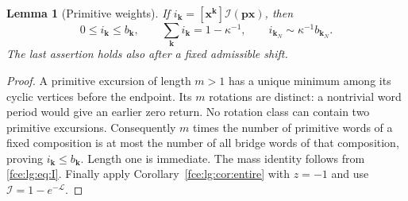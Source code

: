 \documentclass[11pt,a4paper]{article}
\numberwithin{equation}{section}
\newtheorem{lemma}[theorem]{Lemma}
\theoremstyle{definition}\newtheorem{definition}[theorem]{Definition}
\theoremstyle{remark}\newtheorem{remark}[theorem]{Remark}
\newcommand{\Lcal}{\mathcal L}
\begin{document}
\begin{lemma}[Primitive weights]\label{fce:lg:lem:primitive}
If $i_{\boldsymbol k}=[\boldsymbol x^{\boldsymbol k}]\mathcal I(\boldsymbol p\boldsymbol x)$,
then
\[
 0\le i_{\boldsymbol k}\le b_{\boldsymbol k},\qquad
 \sum_{\boldsymbol k} i_{\boldsymbol k}=1-\kappa^{-1},\qquad
 i_{\boldsymbol k_N}\sim \kappa^{-1}b_{\boldsymbol k_N}.
\]
The last assertion holds also after a fixed admissible shift.
\end{lemma}
\begin{proof}
A primitive excursion of length $m>1$ has a unique minimum among its cyclic
vertices before the endpoint. Its $m$ rotations are distinct: a nontrivial
word period would give an earlier zero return. No rotation class can
contain two primitive excursions. Consequently $m$ times the number of
primitive words of a fixed composition is at most the number of all bridge
words of that composition, proving $i_{\boldsymbol k}\le b_{\boldsymbol k}$.
Length one is immediate. The mass identity follows from
\eqref{fce:lg:eq:I}. Finally apply Corollary~\ref{fce:lg:cor:entire} with
$z=-1$ and use $\mathcal I=1-e^{-\Lcal}$.
\end{proof}
\end{document}
